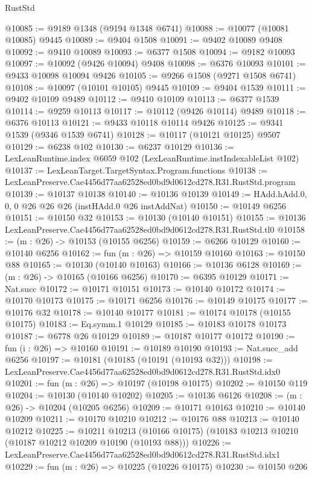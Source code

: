 \begin{lexlean}{RustStd}
\begin{coremodule}
@10085 := @9189 @1348 (@9194 @1348 @6741)
@10088 := @10077 (@10081 @10085) @9445
@10089 := @9404 @1508
@10091 := @9402 @10089 @9408
@10092 := @9410 @10089
@10093 := @6377 @1508
@10094 := @9182 @10093
@10097 := @10092 (@9426 @10094) @9408
@10098 := @6376 @10093
@10101 := @9433 @10098 @10094 @9426
@10105 := @9266 @1508 (@9271 @1508 @6741)
@10108 := @10097 (@10101 @10105) @9445
@10109 := @9404 @1539
@10111 := @9402 @10109 @9489
@10112 := @9410 @10109
@10113 := @6377 @1539
@10114 := @9259 @10113
@10117 := @10112 (@9426 @10114) @9489
@10118 := @6376 @10113
@10121 := @9433 @10118 @10114 @9426
@10125 := @9341 @1539 (@9346 @1539 @6741)
@10128 := @10117 (@10121 @10125) @9507
@10129 := @6238 @102
@10130 := @6237 @10129
@10136 := LexLeanRuntime.index @6059 @102 (LexLeanRuntime.instIndexableList @102)
@10137 := LexLeanTarget.TargetSyntax.Program.functions
@10138 := LexLeanPreserve.Cae4456d77aa62528ed0bd9d0612cd278.R31.RustStd.program
@10139 := @10137 @10138
@10140 := @10136 @10139
@10149 := HAdd.hAdd.{0, 0, 0} @26 @26 @26 (instHAdd.{0} @26 instAddNat)
@10150 := @10149 @6256
@10151 := @10150 @32
@10153 := @10130 (@10140 @10151)
@10155 := @10136 LexLeanPreserve.Cae4456d77aa62528ed0bd9d0612cd278.R31.RustStd.tl0
@10158 := (m : @26) -> @10153 (@10155 @6256)
@10159 := @6266 @10129
@10160 := @10140 @6256
@10162 := fun (m : @26) => @10159 @10160
@10163 := @10150 @88
@10165 := @10130 (@10140 @10163)
@10166 := @10136 @6128
@10169 := (m : @26) -> @10165 (@10166 @6256)
@10170 := @6395 @10129
@10171 := Nat.succ
@10172 := @10171 @10151
@10173 := @10140 @10172
@10174 := @10170 @10173
@10175 := @10171 @6256
@10176 := @10149 @10175
@10177 := @10176 @32
@10178 := @10140 @10177
@10181 := @10174 @10178 (@10155 @10175)
@10183 := Eq.symm.{1} @10129
@10185 := @10183 @10178 @10173
@10187 := @6778 @26 @10129
@10189 := @10187 @10177 @10172
@10190 := fun (i : @26) => @10160
@10191 := @10189 @10190
@10193 := Nat.succ_add @6256
@10197 := @10181 (@10185 (@10191 (@10193 @32)))
@10198 := LexLeanPreserve.Cae4456d77aa62528ed0bd9d0612cd278.R31.RustStd.idx0
@10201 := fun (m : @26) => @10197 (@10198 @10175)
@10202 := @10150 @119
@10204 := @10130 (@10140 @10202)
@10205 := @10136 @6126
@10208 := (m : @26) -> @10204 (@10205 @6256)
@10209 := @10171 @10163
@10210 := @10140 @10209
@10211 := @10170 @10210
@10212 := @10176 @88
@10213 := @10140 @10212
@10225 := @10211
    @10213
    (@10166 @10175)
    (@10183 @10213 @10210 (@10187 @10212 @10209 @10190 (@10193 @88)))
@10226 := LexLeanPreserve.Cae4456d77aa62528ed0bd9d0612cd278.R31.RustStd.idx1
@10229 := fun (m : @26) => @10225 (@10226 @10175)
@10230 := @10150 @206

\end{coremodule}
\end{lexlean}
